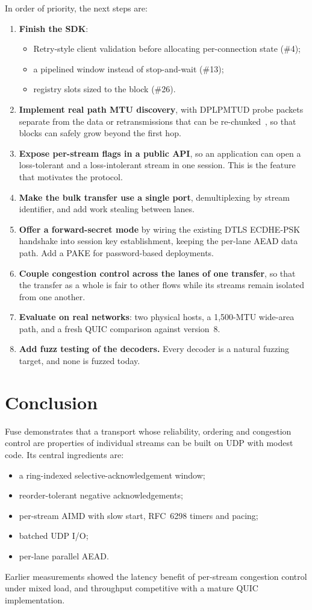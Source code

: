 In order of priority, the next steps are:
\begin{enumerate}
  \item \textbf{Finish the SDK}:
    \begin{itemize}
      \item Retry-style client validation before allocating per-connection state (\#4);
      \item a pipelined window instead of stop-and-wait (\#13);
      \item registry slots sized to the block (\#26).
    \end{itemize}
  \item \textbf{Implement real path MTU discovery}, with DPLPMTUD probe packets separate from the data or
    retransmissions that can be re-chunked~\cite{rfc8899}, so that blocks can safely grow beyond the first hop.
  \item \textbf{Expose per-stream flags in a public API}, so an application can open a loss-tolerant and a
    loss-intolerant stream in one session. This is the feature that motivates the protocol.
  \item \textbf{Make the bulk transfer use a single port}, demultiplexing by stream identifier, and add work
    stealing between lanes.
  \item \textbf{Offer a forward-secret mode} by wiring the existing DTLS ECDHE-PSK handshake into session key
    establishment, keeping the per-lane AEAD data path. Add a PAKE for password-based deployments.
  \item \textbf{Couple congestion control across the lanes of one transfer}, so that the transfer as a whole is
    fair to other flows while its streams remain isolated from one another.
  \item \textbf{Evaluate on real networks}: two physical hosts, a 1,500-MTU wide-area path, and a fresh QUIC
    comparison against version~8.
  \item \textbf{Add fuzz testing of the decoders.} Every decoder is a natural fuzzing target, and none is fuzzed
    today.
\end{enumerate}

\section{Conclusion}

Fuse demonstrates that a transport whose reliability, ordering and congestion control are properties of
individual streams can be built on UDP with modest code. Its central ingredients are:
\begin{itemize}
  \item a ring-indexed selective-acknowledgement window;
  \item reorder-tolerant negative acknowledgements;
  \item per-stream AIMD with slow start, RFC~6298 timers and pacing;
  \item batched UDP I/O;
  \item per-lane parallel AEAD.
\end{itemize}
Earlier measurements showed the latency benefit of per-stream congestion control under mixed load, and
throughput competitive with a mature QUIC implementation.

